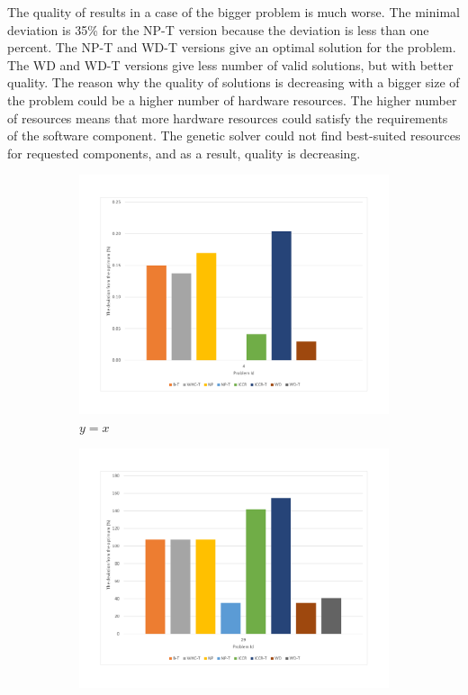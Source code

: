 The quality of results in a case of the bigger problem is much worse. The minimal deviation is 35\% for the NP-T version because the deviation is less than one percent. The NP-T and WD-T versions give an optimal solution for the problem. The WD and WD-T versions give less number of valid solutions, but with better quality. The reason why the quality of solutions is decreasing with a bigger size of the problem could be a higher number of hardware resources. The higher number of resources means that more hardware resources could satisfy the requirements of the software component. The genetic solver could not find best-suited resources for requested components, and as a result, quality is decreasing. 


\begin{figure}
	\centering
	\begin{subfigure}{0.45\textwidth}
		\includegraphics[width=\textwidth]{images/EnergyDeviationSmallProblem.pdf}
		\caption{$y=x$}
		\label{fig:SmallProblemEnergy}
	\end{subfigure}
	\hfill
	\begin{subfigure}{0.45\textwidth}
		\includegraphics[width=\textwidth]{images/EnergyDeviationMediumProblem.pdf}

\end{subfigure}
\end{figure}
